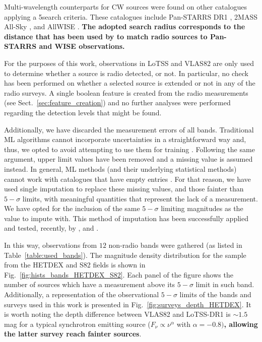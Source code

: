 \documentclass{aa}
\begin{document}
Multi-wavelength counterparts for CW sources were found on other catalogues applying a 5\arcsec search criteria.
These catalogues include Pan-STARRS DR1 \citep[PS1;][]{2020ApJS..251....7F}, 2MASS All-Sky \citep[2M;][]{2006AJ....131.1163S, 2003tmc..book.....C, 2003yCat.2246....0C}, and AllWISE \citep[AW;][]{2013wise.rept....1C}. \textbf{The adopted search radius corresponds to the distance that has been used by \citet{2010AJ....140.1868W} to match radio sources to Pan-STARRS and WISE observations.}

For the purposes of this work, observations in LoTSS and VLAS82 are only used to determine whether a source is radio detected, or not. In particular, no check has been performed on whether a selected source is extended or not in any of the radio surveys. A single boolean feature is created from the radio measurements (see Sect.~\ref{sec:feature_creation}) and no further analyses were performed regarding the detection levels that might be found.

Additionally, we have discarded the measurement errors of all bands. Traditional ML algorithms cannot incorporate uncertainties in a straightforward way and, thus, we opted to avoid attempting to use them for training \citep[for some examples on how they have been incorporated in astrophysically motivated ML studies, see][]{2008ApJ...683...12B, 2019AJ....157...16R, 2022AJ....164....6S}. Following the same argument, upper limit values have been removed and a missing value is assumed instead. In general, ML methods (and their underlying statistical methods) cannot work with catalogues that have empty entries \citep{allison2001missing}. For that reason, we have used single imputation \citep[a review on the use of this method in astronomy can be seen in][]{ChattopadhyayData} to replace these missing values, and those fainter than $5{-}\sigma$ limits, with meaningful quantities that represent the lack of a measurement. 
We have opted for the inclusion of the same $5{-}\sigma$ limiting magnitudes as the value to impute with. 
This method of imputation has been successfully applied and tested, recently, by \citet{2021Galax...9...86C, 2022MNRAS.512.2099C}, and \citet{2022MNRAS.514....1C}.

In this way, observations from $12$ non-radio bands were gathered (as listed in Table~\ref{table:used_bands}). 
The magnitude density distribution for the sample from the HETDEX and S82 fields is shown in Fig.~\ref{fig:hists_bands_HETDEX_S82}. Each panel of the figure shows the number of sources which have a measurement above its $5{-}\sigma$ limit in such band. 
Additionally, a representation of the observational $5{-}\sigma$ limits of the bands and surveys used in this work is presented in Fig.~\ref{fig:surveys_depth_HETDEX}. 
It is worth noting the depth difference between VLAS82 and LoTSS-DR1 is ${\sim}1.5$\,mag for a typical synchrotron emitting source ($F_\nu \propto \nu^{\alpha}$ with $\alpha=-0.8)$\textbf{, allowing the latter survey reach fainter sources}.%
\end{document}
